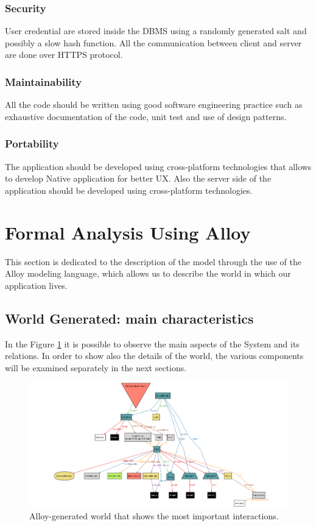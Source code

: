 \documentclass[a4paper, 12pt, oneside]{article}
\begin{document}
\subsubsection{Security}
User credential are stored inside the DBMS using a randomly generated salt and possibly a slow hash function. All the communication between client and server are done over HTTPS protocol.  
\subsubsection{Maintainability}
All the code should be written using good software engineering practice such as exhaustive documentation of the code, unit test and use of design patterns.
\subsubsection{Portability}
The application should be developed using cross-platform technologies that allows to develop Native application for better UX.
Also the server side of the application should be developed using cross-platform technologies.

\newpage
\section{Formal Analysis Using Alloy}
\label{analysisAndAlloy}
This section is dedicated to the description of the model through the use of the Alloy modeling language, which allows us to describe the world in which our application lives.

\subsection{World Generated: main characteristics}
In the Figure \ref{alloy_world} it is possible to observe the main aspects of the System and its relations. In order to show also the details of the world, the various components will be examined separately in the next sections.
\begin{figure}[h!]
\centering
    \centering
    \includegraphics[height=0.32\textheight, scale=0.3, keepaspectratio]{img/alloy/alloy_world.png}
    \caption{Alloy-generated world that shows the most important interactions.}
    \label{alloy_world}
\end{figure}
\end{document}
